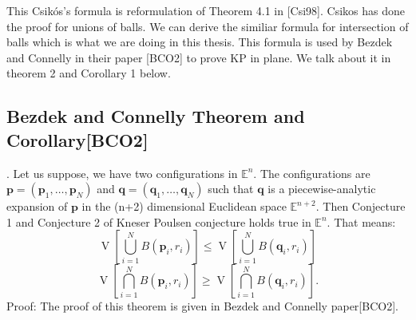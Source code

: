  This Csikós's formula is reformulation of Theorem 4.1 in [Csi98]. Csikos has done the proof  for unions of balls. We can derive the similiar formula for intersection of balls which is what we are doing in this thesis. This formula is used by Bezdek and Connelly in their paper [BCO2] to prove KP in plane. We talk about it in theorem 2 and Corollary 1 below.



 















\subsection{Bezdek and Connelly Theorem and Corollary[BCO2]}
 . Let us suppose, we have two configurations in $\mathbb{E}^{n}$. The configurations are $\boldsymbol{p}=\left(\boldsymbol{p}_{1}, \ldots, \boldsymbol{p}_{N}\right)$ and $\boldsymbol{q}=\left(\boldsymbol{q}_{1}, \ldots, \boldsymbol{q}_{N}\right)$  such that $\boldsymbol{q}$ is a piecewise-analytic expansion of $\boldsymbol{p}$ in the (n+2) dimensional Euclidean space $\mathbb{E}^{n+2}$. Then Conjecture 1 and Conjecture 2  of Kneser Poulsen conjecture holds true in $\mathbb{E}^{n}$. That means:
$$
\operatorname{V}\left[\bigcup_{i=1}^{N} B\left(\boldsymbol{p}_{i}, r_{i}\right)\right] \leq \operatorname{V}\left[\bigcup_{i=1}^{N} B\left(\boldsymbol{q}_{i}, r_{i}\right)\right]
$$
$$
\operatorname{V}\left[\bigcap_{i=1}^{N} B\left(\boldsymbol{p}_{i}, r_{i}\right)\right] \geq \operatorname{V}\left[\bigcap_{i=1}^{N} B\left(\boldsymbol{q}_{i}, r_{i}\right)\right] .
$$
Proof: The proof of this theorem is given in Bezdek and Connelly paper[BCO2].\\


